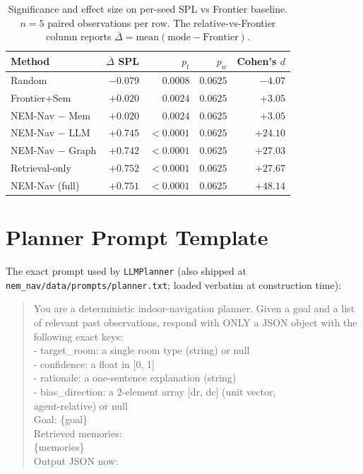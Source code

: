 \documentclass[conference,a4paper,10pt]{IEEEtran}
\begin{document}
\begin{table}[h]
\centering
\caption{Significance and effect size on per-seed SPL vs Frontier
baseline. $n{=}5$ paired observations per row.
The relative-vs-Frontier column reports
$\overline{\Delta} = \mathrm{mean}(\mathrm{mode} - \mathrm{Frontier})$.}
\label{tab:stats}
\small
\begin{tabular}{lrrrr}
\toprule
\textbf{Method} & $\overline{\Delta}$ \textbf{SPL}
                & $p_t$ & $p_w$ & \textbf{Cohen's} $d$ \\
\midrule
Random            & $-0.079$ & $0.0008$ & $0.0625$ & $-4.07$ \\
Frontier+Sem      & $+0.020$ & $0.0024$ & $0.0625$ & $+3.05$ \\
NEM-Nav $-$ Mem   & $+0.020$ & $0.0024$ & $0.0625$ & $+3.05$ \\
NEM-Nav $-$ LLM   & $+0.745$ & $<0.0001$ & $0.0625$ & $+24.10$ \\
NEM-Nav $-$ Graph & $+0.742$ & $<0.0001$ & $0.0625$ & $+27.03$ \\
Retrieval-only    & $+0.752$ & $<0.0001$ & $0.0625$ & $+27.67$ \\
NEM-Nav (full)    & $+0.751$ & $<0.0001$ & $0.0625$ & $+48.14$ \\
\bottomrule
\end{tabular}
\end{table}

\section{Planner Prompt Template}
\label{app:prompt}

The exact prompt used by \texttt{LLMPlanner} (also shipped at
\texttt{nem\_nav/data/prompts/planner.txt}; loaded verbatim at
construction time):

\begin{quote}\small\ttfamily
You are a deterministic indoor-navigation planner. Given a goal and a
list of relevant past observations, respond with ONLY a JSON object with
the following exact keys:\\[2pt]
\hspace*{1em}- target\_room: a single room type (string) or null\\
\hspace*{1em}- confidence:  a float in [0, 1]\\
\hspace*{1em}- rationale:   a one-sentence explanation (string)\\
\hspace*{1em}- bias\_direction: a 2-element array [dr, dc] (unit vector,\\
\hspace*{4em}                  agent-relative) or null\\[4pt]
Goal: \{goal\}\\[4pt]
Retrieved memories:\\
\{memories\}\\[4pt]
Output JSON now:
\end{quote}
\end{document}

